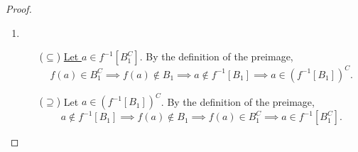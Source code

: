 \documentclass[11pt,openany]{article}
\begin{document}
\begin{proof}
{\begin{enumerate}[(1)]
\begin{itemize}
\begin{enumerate}[(i)]
			\item $f(a)\in B_1\implies a\in f^{-1}[B_1]$.
			\item $f(a)\in B_2\implies a\in f^{-1}[B_2]$.
		\end{enumerate}\ \\ \underline{Thus, $a\in f^{-1}[B_1]\cap f[B_2]$}.
		\vspace{12pt}
		\newpage
		\item[($\supseteq$)] \underline{Let $a\in f^{-1}[B_1]\cap f^{-1}[B_2]$}. Then $a\in f^{-1}[B_1]$ and $a\in f^{-1}[B_2]$. Then \textit{both} of the following hold:\\ \begin{enumerate}[(i)]
			\item $a\in f^{-1}[B_1]\implies f(a)\in B_1$.
			\item $a\in f^{-1}[B_2]\implies f(a)\in B_2$.
		\end{enumerate} \ \\
		That is, $f(a)\in B_1\cap B_2$. \underline{Thus, $a\in f^{-1}[B_1\cap B_2]$}.
	\end{itemize}
	\vspace{12pt}
	\item \begin{itemize}
		\item[($\subseteq$)] 
		\underline{Let $a\in f^{-1}[B_1^C]$}. By the definition of the preimage, \[
		f(a)\in B_1^C\implies f(a)\notin B_1\implies a\notin f^{-1}[B_1]\implies a\in(f^{-1}[B_1])^C.
		\]
		\item[($\supseteq$)] Let $a\in(f^{-1}[B_1])^C$. By the definition of the preimage, \[
		a\notin f^{-1}[B_1]\implies f(a)\notin B_1\implies f(a)\in B_1^C\implies a\in f^{-1}[B_1^C].
		\]
	\end{itemize}
\end{enumerate}}
\end{proof}
\vfill
{}
\end{document}
